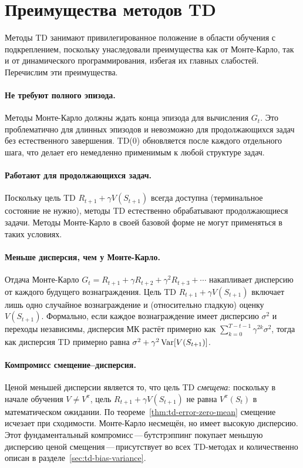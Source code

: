 \section{Преимущества методов TD}
\label{sec:td-advantages}

Методы TD занимают привилегированное положение в области обучения с подкреплением, поскольку унаследовали преимущества как от Монте-Карло, так и от динамического программирования, избегая их главных слабостей.  Перечислим эти преимущества.

\paragraph{Не требуют полного эпизода.}
Методы Монте-Карло должны ждать конца эпизода для вычисления $G_t$.  Это проблематично для длинных эпизодов и невозможно для продолжающихся задач без естественного завершения.  TD(0) обновляется после каждого отдельного шага, что делает его немедленно применимым к любой структуре задач.

\paragraph{Работают для продолжающихся задач.}
Поскольку цель TD $R_{t+1}+\gamma V(S_{t+1})$ всегда доступна (терминальное состояние не нужно), методы TD естественно обрабатывают продолжающиеся задачи.  Методы Монте-Карло в своей базовой форме не могут применяться в таких условиях.

\paragraph{Меньше дисперсия, чем у Монте-Карло.}
Отдача Монте-Карло $G_t = R_{t+1} + \gamma R_{t+2} + \gamma^2 R_{t+3} + \cdots$ накапливает дисперсию от каждого будущего вознаграждения.  Цель TD $R_{t+1}+\gamma V(S_{t+1})$ включает лишь одно случайное вознаграждение и (относительно гладкую) оценку $V(S_{t+1})$.  Формально, если каждое вознаграждение имеет дисперсию $\sigma^2$ и переходы независимы, дисперсия МК растёт примерно как $\sum_{k=0}^{T-t-1} \gamma^{2k}\sigma^2$, тогда как дисперсия TD примерно равна $\sigma^2 + \gamma^2 \operatorname{Var}[V(S_{t+1})]$.

\paragraph{Компромисс смещение--дисперсия.}
Ценой меньшей дисперсии является то, что цель TD \emph{смещена}: поскольку в начале обучения $V \ne V^\pi$, цель $R_{t+1}+\gamma V(S_{t+1})$ не равна $V^\pi(S_t)$ в математическом ожидании.  По теореме~\ref{thm:td-error-zero-mean} смещение исчезает при сходимости.  Монте-Карло несмещён, но имеет высокую дисперсию.  Этот фундаментальный компромисс\,---\,бутстрэппинг покупает меньшую дисперсию ценой смещения\,---\,присутствует во всех TD-методах и количественно описан в разделе~\ref{sec:td-bias-variance}.

